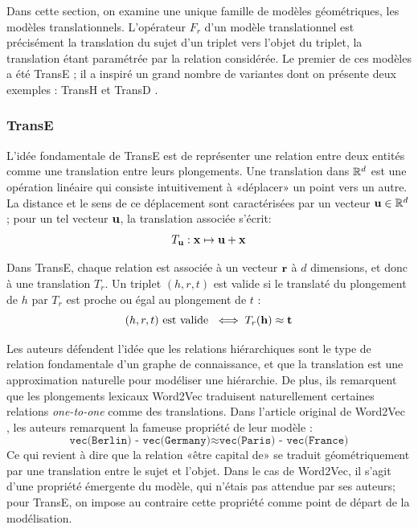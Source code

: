 Dans cette section, on examine une unique famille de modèles géométriques, les modèles translationnels. L'opérateur $F_r$ d'un modèle translationnel est précisément la translation du sujet d'un triplet vers l'objet du triplet, la translation étant paramétrée par la relation considérée. Le premier de ces modèles a été TransE \cite{bordes2013translating}; il a inspiré un grand nombre de variantes dont on présente deux exemples : TransH \cite{transh} et TransD \cite{transd}.

\subsubsection{TransE \cite{bordes2013translating}}

L'idée fondamentale de TransE est de représenter une relation entre deux entités comme une translation entre leurs plongements. Une translation dans $\R^d$ est une opération linéaire qui consiste intuitivement à «déplacer» un point vers un autre. La distance et le sens de ce déplacement sont caractérisées par un vecteur $\bf{u} \in \R^d$; pour un tel vecteur $\bf{u}$, la translation associée s'écrit:
\begin{equation}
    T_\bf{u} : \bf{x} \mapsto \bf{u + x}
\end{equation}

Dans TransE, chaque relation est associée à un vecteur $\bf{r}$ à $d$ dimensions, et donc à une translation $T_r$. Un triplet $(h, r, t)$ est valide si le translaté du plongement de $h$ par $T_r$ est proche ou égal au plongement de $t$ :
\begin{equation}
    (h, r, t) \text{ est valide } \iff T_r(\bf{h}) \approx \bf{t} 
\end{equation}

Les auteurs défendent l'idée que les relations hiérarchiques sont le type de relation fondamentale d'un graphe de connaissance, et que la translation est une approximation naturelle pour modéliser une hiérarchie. %
De plus, ils remarquent que les plongements lexicaux Word2Vec \cite{mikolov2013distributed} traduisent naturellement certaines relations \textit{one-to-one} comme des translations. Dans l'article original de Word2Vec \cite{mikolov2013distributed}, les auteurs remarquent la fameuse propriété de leur modèle :
\begin{equation}
    \texttt{vec(Berlin) - vec(Germany)} \approx 
    \texttt{vec(Paris) - vec(France)}
\end{equation}
Ce qui revient à dire que la relation «être capital de» se traduit géométriquement par une translation entre le sujet et l'objet. Dans le cas de Word2Vec, il s'agit d'une propriété émergente du modèle, qui n'étais pas attendue par ses auteurs; pour TransE, on impose au contraire cette propriété comme point de départ de la modélisation.

